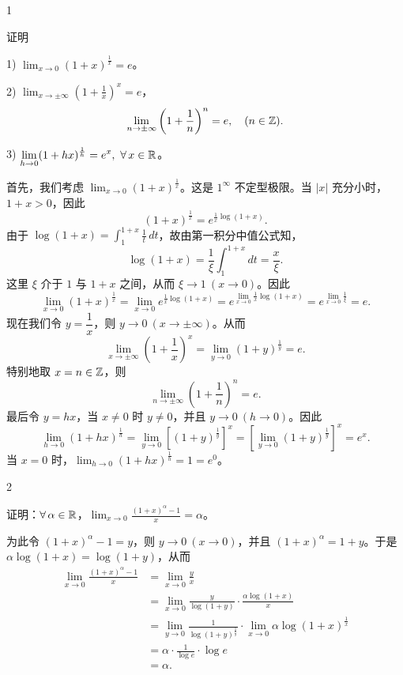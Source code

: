 \begin{sourceexample}{1}

	证明

	1) \(\displaystyle\lim_{x\to0}(1+x)^{\frac1x}=e\)。

	2) \(\displaystyle\lim_{x\to\pm\infty}\left(1+\frac1x\right)^x=e\)，
	\[
	\lim_{n\to\pm\infty}\left(1+\frac1n\right)^n=e,\quad(n\in\mathbb{Z}).
	\]

	3) \(\displaystyle\lim_{h\to0}(1+hx)^{\frac1h}=e^x,\ \forall\,x\in\R\)。

	首先，我们考虑 \(\displaystyle\lim_{x\to0}(1+x)^{\frac1x}\)。这是 \(1^\infty\) 不定型极限。当 \(|x|\) 充分小时，\(1+x>0\)，因此
	\[
	(1+x)^{\frac1x}=e^{\frac1x\log(1+x)}.
	\]
	由于 \(\log(1+x)=\displaystyle\int_1^{1+x}\frac1t\,dt\)，故由第一积分中值公式知，
	\[
	\log(1+x)=\frac1\xi\int_1^{1+x}dt=\frac x\xi.
	\]
	这里 \(\xi\) 介于 \(1\) 与 \(1+x\) 之间，从而 \(\xi\to1\ (x\to0)\)。因此
	\[
	\lim_{x\to0}(1+x)^{\frac1x}=\lim_{x\to0}e^{\frac1x\log(1+x)}=e^{\lim_{x\to0}\frac1x\log(1+x)}=e^{\lim_{x\to0}\frac1\xi}=e.
	\]
	现在我们令 \(y=\dfrac1x\)，则 \(y\to0\ (x\to\pm\infty)\)。从而
	\[
	\lim_{x\to\pm\infty}\left(1+\frac1x\right)^x=\lim_{y\to0}(1+y)^{\frac1y}=e.
	\]
	特别地取 \(x=n\in\mathbb{Z}\)，则
	\[
	\lim_{n\to\pm\infty}\left(1+\frac1n\right)^n=e.
	\]
	最后令 \(y=hx\)，当 \(x\neq0\) 时 \(y\neq0\)，并且 \(y\to0\ (h\to0)\)。因此
	\[
	\lim_{h\to0}(1+hx)^{\frac1h}=\lim_{y\to0}\left[(1+y)^{\frac1y}\right]^x=\left[\lim_{y\to0}(1+y)^{\frac1y}\right]^x=e^x.
	\]
	当 \(x=0\) 时，\(\displaystyle\lim_{h\to0}(1+hx)^{\frac1h}=1=e^0\)。

\end{sourceexample}

\begin{sourceexample}{2}

	证明：\(\forall\,\alpha\in\mathbb{R}\)，\(\displaystyle\lim_{x\to0}\frac{(1+x)^\alpha-1}{x}=\alpha\)。

	为此令 \((1+x)^\alpha-1=y\)，则 \(y\to0\ (x\to0)\)，并且 \((1+x)^\alpha=1+y\)。于是 \(\alpha\log(1+x)=\log(1+y)\)，从而
	\[
	\begin{aligned}
	\lim_{x\to0}\frac{(1+x)^\alpha-1}{x}
	&=\lim_{x\to0}\frac yx\\
	&=\lim_{x\to0}\frac{y}{\log(1+y)}\cdot\frac{\alpha\log(1+x)}x\\
	&=\lim_{y\to0}\frac1{\log(1+y)^{\frac1y}}\cdot\lim_{x\to0}\alpha\log(1+x)^{\frac1x}\\
	&=\alpha\cdot\frac1{\log e}\cdot\log e\\
	&=\alpha.
	\end{aligned}
	\]

\end{sourceexample}

